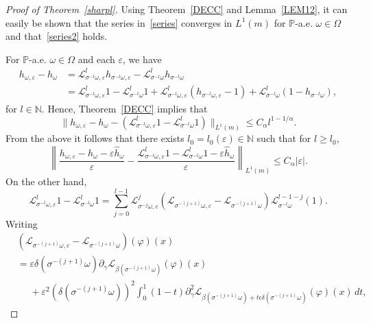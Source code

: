 \documentclass[12pt,reqno,a4paper]{article}
\begin{document}
\begin{proof}[Proof of Theorem~\ref{sharpl}]
	Using Theorem~\ref{DECC} and Lemma~\ref{LEM12}, it can easily be shown that the series in~\eqref{series} converges in $L^1(m)$ for $\mathbb P$-a.e. $\omega \in \Omega$ and that~\eqref{series2} holds.
	
	For $\mathbb P$-a.e. $\omega \in \Omega$ and each $\varepsilon$, we have 
	\[
	\begin{split}
		h_{\omega, \varepsilon}-h_\omega &=\mathcal L_{\sigma^{-l}\omega, \varepsilon}^l h_{\sigma^{-l}\omega, \varepsilon}-\mathcal L_{\sigma^{-l}\omega}^l h_{\sigma^{-l}\omega} \\
		&=\mathcal L_{\sigma^{-l}\omega, \varepsilon}^l 1-\mathcal L_{\sigma^{-l}\omega}^l 1 +\mathcal L_{\sigma^{-l}\omega, \varepsilon}^l(h_{\sigma^{-l}\omega, \varepsilon}-1)+\mathcal L_{\sigma^{-l}\omega}^l(1-h_{\sigma^{-l}\omega}),
	\end{split}
	\]
	for $l\in \mathbb N$. Hence, Theorem~\ref{DECC} implies that 
	\[
	\| h_{\omega, \varepsilon}-h_\omega -(\mathcal L_{\sigma^{-l}\omega, \varepsilon}^l1-\mathcal L_{\sigma^{-l}\omega}^l 1)\|_{L^1(m)} \le C_\alpha l^{1-1/\alpha}.
	\] From the above it follows that there exists $l_0=l_0(\varepsilon)\in \mathbb N$ such that for $l\ge l_0$,
	\begin{equation}\label{ap1}
		\left \| \frac{h_{\omega, \varepsilon}-h_\omega-\varepsilon\hat h_\omega }{\varepsilon}- \frac{\mathcal L_{\sigma^{-l}\omega, \varepsilon}^l1-\mathcal L_{\sigma^{-l}\omega}^l 1-\varepsilon \hat h_\omega}{\varepsilon}\right \|_{L^1(m)} \le C_\alpha |\varepsilon|.
	\end{equation}
	On the other hand,
	\[
	\mathcal L_{\sigma^{-l}\omega, \varepsilon}^l 1- \mathcal L_{\sigma^{-l}\omega}^l1=\sum_{j=0}^{l-1} \mathcal L_{\sigma^{-j}\omega, \varepsilon}^j (\mathcal L_{\sigma^{-(j+1)}\omega, \varepsilon}-\mathcal L_{\sigma^{-(j+1)}\omega})\mathcal L_{\sigma^{-l}\omega}^{l-1-j}(1).
	\]
	Writing 
	\[
	\begin{split}
		&(\mathcal L_{\sigma^{-(j+1)}\omega, \varepsilon}-\mathcal L_{\sigma^{-(j+1)}\omega})(\varphi)(x)\\
		&=\varepsilon \delta(\sigma^{-(j+1)}\omega)\partial_\gamma \mathcal L_{\beta(\sigma^{-(j+1)}\omega)} (\varphi)(x)\\
		&\phantom{=}+\varepsilon^2 (\delta(\sigma^{-(j+1)}\omega))^2\int_0^1 (1-t)\partial_\gamma^2 \mathcal L_{\beta(\sigma^{-(j+1)}\omega)+t\epsilon \delta(\sigma^{-(j+1)}\omega)}(\varphi)(x)\, dt,
	\end{split}
\]
\end{proof}
\end{document}
